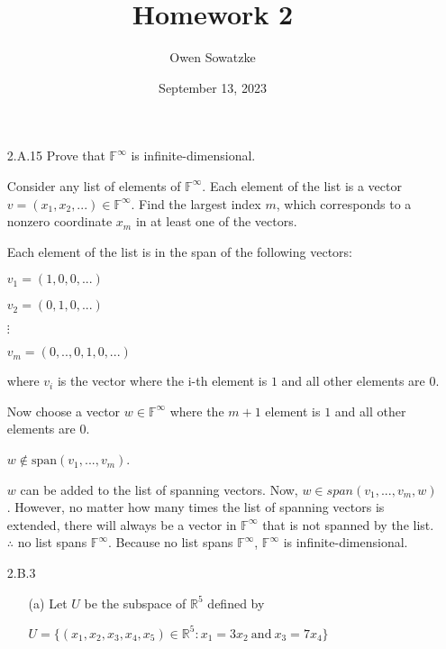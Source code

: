 \documentclass[fleqn]{article}
\title{Homework 2}
\author{Owen Sowatzke}
\date{September 13, 2023}
\begin{document}
	\doublespacing
	\setlength{\abovedisplayskip}{0pt}
	\setlength{\belowdisplayskip}{0pt}
	\setlength{\abovedisplayshortskip}{0pt}
	\setlength{\belowdisplayshortskip}{0pt}
	\setlength{\mathindent}{0pt}
	\maketitle
				
	\begin{enumerate}[nolistsep]
	
		\item[2.A.15] Prove that $\mathbb{F}^\infty$ is infinite-dimensional.
		
		Consider any list of elements of $\mathbb{F}^\infty$. Each element of the list is a vector $v = (x_1, x_2, ...) \in \mathbb{F}^\infty$. Find the largest index $m$, which corresponds to a nonzero coordinate $x_m$ in at least one of the vectors.
		
		 Each element of the list is in the span of the following vectors:
		 
		 $v_1 = (1, 0, 0, ...)$
		 
		 $v_2 = (0, 1, 0, ...)$
		 
		 $\vdots$
		 
		 $v_m = (0, .., 0, 1, 0, ...)$
		 
		 where $v_i$ is the vector where the i-th element is $1$ and all other elements are $0$.
		 
		 Now choose a vector $w \in \mathbb{F}^\infty$ where the $m + 1$ element is $1$ and all other elements are $0$.
		 
		 $w \not\in \text{span}(v_1, ..., v_m)$.
		 
		 $w$ can be added to the list of spanning vectors. Now, $w \in span(v_1, ..., v_m, w)$. However, no matter how many times the list of spanning vectors is extended, there will always be a vector in $\mathbb{F}^\infty$ that is not spanned by the list. $\therefore$ no list spans $\mathbb{F}^\infty$. Because no list spans $\mathbb{F}^\infty$, $\mathbb{F}^\infty$ is infinite-dimensional.
		
		\item[2.B.3]
		
		 	\begin{enumerate}[nolistsep]
		 	
		 		\item[(a)] Let $U$ be the subspace of $\mathbb{R}^5$ defined by
		
				$U = \{(x_1, x_2, x_3, x_4, x_5) \in \mathbb{R}^5 : x_1 = 3x_2\ \text{and}\ x_3 = 7x_4\}$
		

\end{enumerate}
\end{enumerate}
\end{document}
